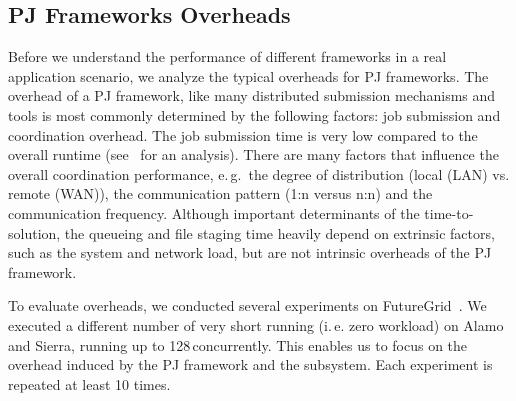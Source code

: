 \documentclass[conference]{IEEEtran}
\begin{document}

\subsection{PJ Frameworks Overheads}\label{sec:pj_performance}



Before we understand the performance of different frameworks in a real
application scenario, we analyze the typical overheads for PJ
frameworks.  The overhead of a PJ framework, like many distributed
submission mechanisms and tools is most commonly determined by the
following factors: job submission and coordination overhead. The job
submission time is very low compared to the overall runtime
(see~\cite{saga_europar10} for an analysis).  There are many factors
that influence the overall coordination performance, e.\,g.\ the
degree of distribution (local (LAN) vs. remote (WAN)), the
communication pattern (1:n versus n:n) and the communication
frequency.  Although important determinants of the time-to-solution,
the queueing and file staging time heavily depend on extrinsic
factors, such as the system and network load, but are not intrinsic
overheads of the PJ framework.


To evaluate \cc overheads, we conducted several experiments on
FutureGrid~\cite{fg}. We executed a different number of very short
running (i.\,e. zero workload) \cus on Alamo and Sierra, running up to
128\,\cus concurrently.  This enables us to focus on the overhead
induced by the PJ framework and the \cc subsystem. Each experiment is
repeated at least 10 times.
\end{document}

